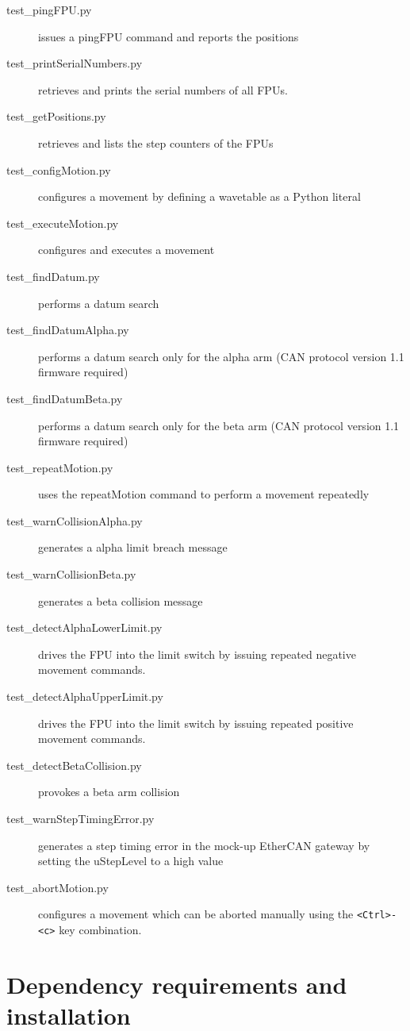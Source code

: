 \documentclass[11pt,a4paper]{scrartcl}
\begin{document}
\begin{description}
\item[test\_pingFPU.py] issues a pingFPU command and reports the positions
\item[test\_printSerialNumbers.py] retrieves and prints the serial numbers of all FPUs.
\item[test\_getPositions.py] retrieves and lists the step counters of the FPUs
\item[test\_configMotion.py] configures a movement by defining a wavetable as a Python literal
\item[test\_executeMotion.py] configures and executes a movement
\item[test\_findDatum.py] performs a datum search
\item[test\_findDatumAlpha.py] performs a datum search only for the alpha arm (CAN protocol version 1.1 firmware required)
\item[test\_findDatumBeta.py] performs a datum search only for the beta arm (CAN protocol version 1.1 firmware required)
\item[test\_repeatMotion.py] uses the repeatMotion command to perform a movement repeatedly
\item[test\_warnCollisionAlpha.py] generates a alpha limit breach message
\item[test\_warnCollisionBeta.py] generates a beta collision message
\item[test\_detectAlphaLowerLimit.py] drives the FPU into the limit switch by issuing repeated negative movement commands.
\item[test\_detectAlphaUpperLimit.py] drives the FPU into the limit switch by issuing repeated positive movement commands.
\item[test\_detectBetaCollision.py] provokes a beta arm collision
\item[test\_warnStepTimingError.py] generates a step timing error
  in the mock-up EtherCAN gateway by setting the uStepLevel to a high
  value  
\item[test\_abortMotion.py]  configures a movement which can be aborted
  manually using the \verb+<Ctrl>-<c>+ key combination.
\end{description}

\section{Dependency requirements and installation}
\label{sec:installationfromscratch}
\end{document}
